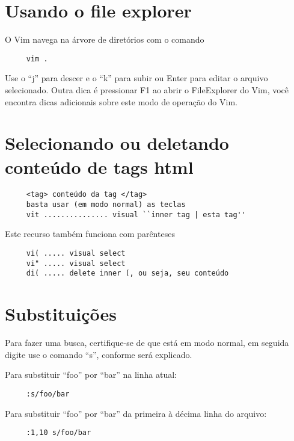 \section{Usando o file explorer}
\label{Usando o file explorer}
O Vim navega na árvore de diretórios com o comando

\begin{verbatim}
     vim .
\end{verbatim}

Use o ``j'' para descer e o ``k'' para subir ou Enter para editar o
arquivo selecionado. Outra dica é pressionar F1 ao abrir o
FileExplorer do Vim, você encontra dicas adicionais sobre este modo de
operação do Vim.

\section{Selecionando ou deletando conteúdo de tags html}
\label{Selecionando ou deletando conteúdo de tags html}

\begin{verbatim}
     <tag> conteúdo da tag </tag>
     basta usar (em modo normal) as teclas
     vit ............... visual ``inner tag | esta tag''
\end{verbatim}

Este recurso também funciona com parênteses

\begin{verbatim}
     vi( ..... visual select
     vi" ..... visual select
     di( ..... delete inner (, ou seja, seu conteúdo
\end{verbatim}


\section{Substituições }
\label{Substituições }

Para fazer uma busca, certifique-se de que está em modo normal, em
seguida digite use o comando ``s'', conforme será explicado.

Para substituir ``foo'' por ``bar'' na linha atual:

\begin{verbatim}
     :s/foo/bar
\end{verbatim}

Para substituir ``foo'' por ``bar'' da primeira à décima linha do arquivo:

\begin{verbatim}
     :1,10 s/foo/bar
\end{verbatim}

